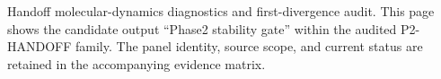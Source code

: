 Handoff molecular-dynamics diagnostics and first-divergence audit. This page shows the candidate output ``Phase2 stability gate'' within the audited P2-HANDOFF family. The panel identity, source scope, and current status are retained in the accompanying evidence matrix.
